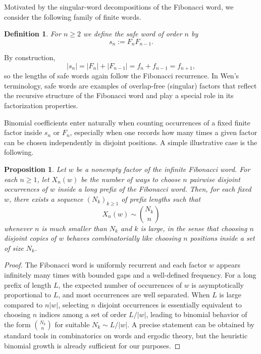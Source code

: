 \documentclass[12pt]{amsart}
\newtheorem{proposition}[theorem]{Proposition}
\newtheorem{definition}{Definition}
\begin{document}
Motivated by the singular-word decompositions of the Fibonacci word, we consider the following family of finite words.

\begin{definition}
For $n\ge 2$ we define the \emph{safe word} of order $n$ by
\[
s_n := F_n F_{n-1}.
\]
\end{definition}

By construction,
\[
|s_n| = |F_n| + |F_{n-1}| = f_n + f_{n-1} = f_{n+1},
\]
so the lengths of safe words again follow the Fibonacci recurrence. In Wen's terminology, safe words are examples of overlap-free (singular) factors that reflect the recursive structure of the Fibonacci word and play a special role in its factorization properties.

Binomial coefficients enter naturally when counting occurrences of a fixed finite factor inside $s_n$ or $F_n$, especially when one records how many times a given factor can be chosen independently in disjoint positions. A simple illustrative case is the following.

\begin{proposition}\label{prop:binom-occ}
Let $w$ be a nonempty factor of the infinite Fibonacci word. For each $n\ge 1$, let $X_n(w)$ be the number of ways to choose $n$ pairwise disjoint occurrences of $w$ inside a long prefix of the Fibonacci word. Then, for each fixed $w$, there exists a sequence $(N_k)_{k\ge 1}$ of prefix lengths such that
\[
X_n(w) \sim \binom{N_k}{n}
\]
whenever $n$ is much smaller than $N_k$ and $k$ is large, in the sense that choosing $n$ disjoint copies of $w$ behaves combinatorially like choosing $n$ positions inside a set of size $N_k$.
\end{proposition}

\begin{proof}[Proof]
The Fibonacci word is uniformly recurrent and each factor $w$ appears infinitely many times with bounded gaps and a well-defined frequency. For a long prefix of length $L$, the expected number of occurrences of $w$ is asymptotically proportional to $L$, and most occurrences are well separated. When $L$ is large compared to $n|w|$, selecting $n$ disjoint occurrences is essentially equivalent to choosing $n$ indices among a set of order $L/|w|$, leading to binomial behavior of the form $\binom{N_k}{n}$ for suitable $N_k\sim L/|w|$. A precise statement can be obtained by standard tools in combinatorics on words and ergodic theory, but the heuristic binomial growth is already sufficient for our purposes.
\end{proof}
\end{document}
